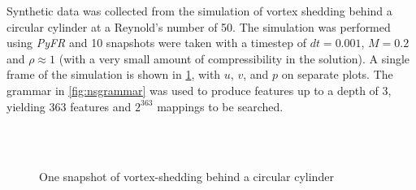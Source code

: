 \documentclass{article}
\begin{document}
Synthetic data was collected from the simulation of vortex shedding behind a circular cylinder at a Reynold's number of 50. The simulation was performed using \emph{PyFR} \cite{witherden2014pyfr} and 10 snapshots were taken with a timestep of $dt = 0.001$, $M = 0.2$ and $\rho \approx 1$ (with a very small amount of compressibility in the solution). A single frame of the simulation is shown in \cref{fig:ns_data}, with $u$, $v$, and $p$ on separate plots. The grammar in \cref{fig:nsgrammar} was used to produce features up to a depth of 3, yielding 363 features and $2^{363}$ mappings to be searched.

\begin{figure}
  \vskip 0.2in
     \\
     \\
    \caption{One snapshot of vortex-shedding behind a circular cylinder}
    \label{fig:ns_data}
    \vskip -0.2in
\end{figure}
\end{document}
